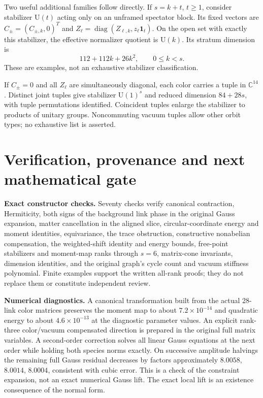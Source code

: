 \documentclass[11pt,a4paper]{article}
\newcommand{\id}{\mathbf1}\newcommand{\tr}{\operatorname{tr}}\newcommand{\diag}{\operatorname{diag}}\newcommand{\Rea}{\operatorname{Re}}
\begin{document}
Two useful additional families follow directly. If $s=k+t$, $t\ge1$, consider stabilizer $\mathrm U(t)$ acting only on an unframed spectator block. Its fixed vectors are $C_\pm=(C_{\pm,k},0)^T$ and $Z_\ell=\diag(Z_{\ell,k},z_\ell\id_t)$. On the open set with exactly this stabilizer, the effective normalizer quotient is $\mathrm U(k)$. Its stratum dimension is
\[
112+112k+26k^2,\qquad 0\le k<s.
\]
These are examples, not an exhaustive stabilizer classification.

If $C_\pm=0$ and all $Z_\ell$ are simultaneously diagonal, each color carries a tuple in $\mathbb C^{14}$. Distinct joint tuples give stabilizer $\mathrm U(1)^s$ and reduced dimension $84+28s$, with tuple permutations identified. Coincident tuples enlarge the stabilizer to products of unitary groups. Noncommuting vacuum tuples allow other orbit types; no exhaustive list is asserted.

\newpage
\section{Verification, provenance and next mathematical gate}
\textbf{Exact constructor checks.} Seventy checks verify canonical contraction, Hermiticity, both signs of the background link phase in the original Gauss expansion, matter cancellation in the aligned slice, circular-coordinate energy and moment identities, equivariance, the trace obstruction, constructive nonabelian compensation, the weighted-shift identity and energy bounds, free-point stabilizers and moment-map ranks through $s=6$, matrix-cone invariants, dimension identities, and the original graph's cycle count and vacuum stiffness polynomial. Finite examples support the written all-rank proofs; they do not replace them or constitute independent review.

\textbf{Numerical diagnostics.} A canonical transformation built from the actual 28-link color matrices preserves the moment map to about $7.2\times10^{-14}$ and quadratic energy to about $4.6\times10^{-13}$ at the diagnostic parameter values. An explicit rank-three color/vacuum compensated direction is prepared in the original full matrix variables. A second-order correction solves all linear Gauss equations at the next order while holding both species norms exactly. On successive amplitude halvings the remaining full Gauss residual decreases by factors approximately $8.0058$, $8.0014$, $8.0004$, consistent with cubic error. This is a check of the constraint expansion, not an exact numerical Gauss lift. The exact local lift is an existence consequence of the normal form.
\end{document}
